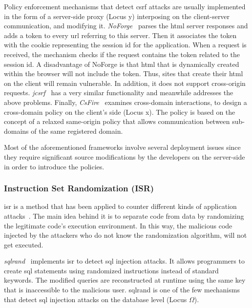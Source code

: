 \documentclass[conference]{IEEEtran}
\begin{document}
Policy enforcement mechanisms that detect {\sc csrf}
attacks are usually implemented in the form of a
server-side proxy (Locus {\sc y})
interposing on the client-server communication, and modifying
it. {\it NoForge}~\cite{JKK06a}
parses the {\sc html} server responses
and adds a token to every {\sc url} referring to this
server. Then it associates the token with the cookie
representing the session {\sc id} for the application.
When a request is received, the mechanism checks
if the request contains the token related
to the session {\sc id}. A disadvantage of NoForge
is that {\sc html} that is dynamically created within
the browser will not include the token.
Thus, sites that create their {\sc html} on the client
will remain vulnerable. In addition, it does not
support cross-origin requests.
{\it j{\sc csrf}}~\cite{PS11}
has a very similar functionality and meanwhile
addresses the above problems.
Finally, {\it CsFire}~\cite{DDHPJ10}
examines cross-domain interactions, to design a
cross-domain policy on the client's side (Locus {\sc x}).
The policy is based on the concept of a relaxed
same-origin policy that allows communication between
sub-domains of the same registered domain.

Most of the aforementioned frameworks involve
several deployment issues since they
require significant source modifications by the
developers on the server-side in order to
introduce the policies.

\subsubsection{Instruction Set Randomization (ISR)}

{\sc isr} is a method that has been applied to counter different kinds
of application attacks~\cite{K09b,KKP03}. The main idea behind it is
to separate code from data by randomizing the legitimate code's
execution environment. In this way, the malicious code injected by the
attackers who do not know the randomization algorithm, will not get
executed.

{\it {\sc sql}rand}~\cite{BK04} implements {\sc isr} to detect {\sc
  sql} injection attacks. It allows programmers to create {\sc sql}
statements using randomized instructions instead of standard keywords.
The modified queries are reconstructed at runtime using the same key
that is inaccessible to the malicious user. {\sc sql}rand is one of
the few mechanisms that detect {\sc sql} injection attacks on the
database level (Locus $\Omega$).
\end{document}
